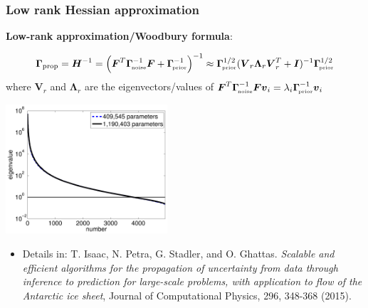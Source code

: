 \documentclass[10pt,final,xcolor=dvipsnames]{beamer}
\newcommand{\ncov} {\bs{\Gamma}_{\!\mbox{\tiny noise}} }
\newcommand{\prcov} {\bs{\Gamma}_{\!\mbox{\tiny prior}} }
\newcommand{\bs}[1]{\ensuremath{\boldsymbol{#1}}}
\newcommand{\Hmatrix}{\bs{H}}
\begin{document}
\begin{frame}
	\frametitle{Low rank Hessian approximation}
	
	\textbf{Low-rank approximation/Woodbury formula}:
	
	\[
	\boldsymbol{\Gamma}_\text{prop} = \Hmatrix^{-1} =
	\left ( {\bs{F}^T\ncov^{-1}\bs{F}} + \prcov^{-1} \right)^{-1}
	\approx \prcov^{1/2} (\bs{V}_r \bs{\Lambda}_r \bs{V}^T_r + \bs{I})^{-1}
	\prcov^{1/2} 
	\]
	where $\bs{V}_r$ and $\bs{\Lambda}_r$ are the eigenvectors/values of
	$\bs{F}^T\ncov^{-1}\bs{F} \bs{v}_i = \lambda_i \prcov^{-1} \bs{v}_i $
	\begin{center}
	\includegraphics[width=0.45\textwidth]{spec_ppmisfit_hess_coarseandfine_new.pdf}
	\end{center}

\begin{itemize}
	\item [] \scriptsize{Details in: T. Isaac, N. Petra, G. Stadler, and
		O. Ghattas. {\em Scalable and efficient algorithms for the
			propagation of uncertainty from data through inference to
			prediction for large-scale problems, with application to flow of
			the Antarctic ice sheet}, Journal of Computational Physics, 296,
		348-368 (2015).}
\end{itemize}
\end{frame}
\end{document}
